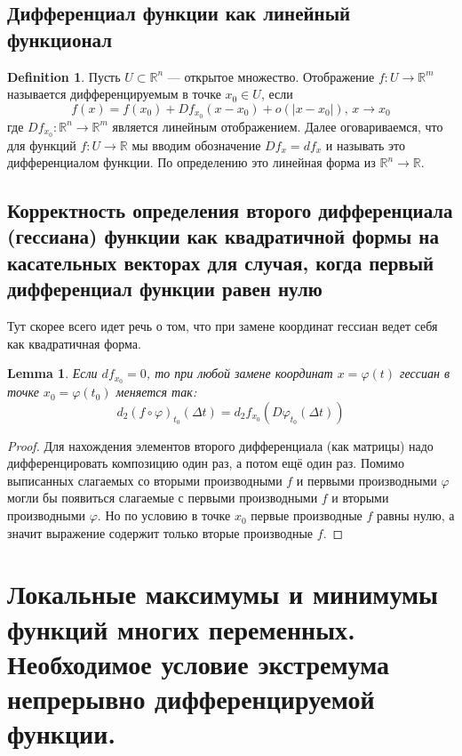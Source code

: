 \documentclass[a4paper,12pt]{article} %
\newtheorem{lemma}[theorem]{Lemma}
\theoremstyle{definition}
\newtheorem{definition}{Definition}[section]
\begin{document}
\subsection{Дифференциал функции как линейный функционал}
\begin{definition}
	Пусть $U \subset \mathbb{R}^n$ --- открытое множество. Отображение $f : U \rightarrow \mathbb{R}^m$ называется дифференцируемым в точке $x_0 \in U$, если
	\begin{equation}
		f(x) = f(x_0) + D f_{x_0} (x - x_0) + o(|x - x_0|), \, x \rightarrow x_0
	\end{equation}
	где $D f_{x_0} :  \mathbb{R}^n \rightarrow \mathbb{R}^m$ является линейным отображением. Далее оговариваемся, что для функций $f : U \rightarrow \mathbb{R}$  мы вводим обозначение $Df_x = df_x$ и называть это дифференциалом функции. По определению это линейная форма из $\mathbb{R}^n \rightarrow \mathbb{R}$.
\end{definition}
\subsection{Корректность определения второго дифференциала (гессиана) функции как квадратичной формы на касательных векторах для случая, когда первый дифференциал функции равен нулю}
Тут скорее всего идет речь о том, что при замене координат гессиан ведет себя как квадратичная форма. 
\begin{lemma}
	Если $df_{x_0} = 0$, то при любой замене координат $x = \varphi(t)$ гессиан в точке $x_0 = \varphi(t_0)$ меняется так:
	\begin{equation}
		d_2(f \circ \varphi)_{t_0}(\Delta t) = d_2 f_{x_0} (D \varphi_{t_0}(\Delta t))
	\end{equation}
\end{lemma}
\begin{proof}
	Для нахождения элементов второго дифференциала (как матрицы) надо дифференцировать композицию один раз, а потом ещё один раз. Помимо выписанных слагаемых со вторыми производными $f$ и первыми производными $\varphi$ могли бы появиться слагаемые с первыми производными $f$ и вторыми производными $\varphi$. Но по условию в точке $x_0$ первые производные $f$ равны нулю, а значит выражение содержит только вторые производные $f$.
\end{proof}
\section{Локальные максимумы и минимумы функций многих переменных. Необходимое условие экстремума непрерывно дифференцируемой функции.}
\end{document}
